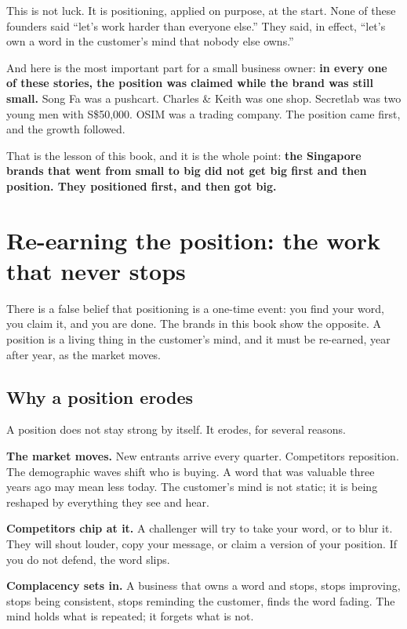 \documentclass[10pt,twoside,openany]{memoir}
\newcommand{\needspacehead}{\needspace{4\baselineskip}}
\let\oldsection\section
\renewcommand{\section}{\needspacehead\oldsection}
\begin{document}
This is not luck. It is positioning, applied on purpose, at the start.
None of these founders said ``let's work harder than everyone else.''
They said, in effect, ``let's own a word in the customer's mind that
nobody else owns.''

And here is the most important part for a small business owner:
\textbf{in every one of these stories, the position was claimed while
the brand was still small.} Song Fa was a pushcart. Charles \& Keith was
one shop. Secretlab was two young men with S\$50,000. OSIM was a trading
company. The position came first, and the growth followed.

That is the lesson of this book, and it is the whole point: \textbf{the
Singapore brands that went from small to big did not get big first and
then position. They positioned first, and then got big.}

\FloatBarrier
\chapter{Re-earning the position: the work that never
stops}\label{re-earning-the-position-the-work-that-never-stops}

There is a false belief that positioning is a one-time event: you find
your word, you claim it, and you are done. The brands in this book show
the opposite. A position is a living thing in the customer's mind, and
it must be re-earned, year after year, as the market moves.

\section{Why a position erodes}\label{why-a-position-erodes}

A position does not stay strong by itself. It erodes, for several
reasons.

\textbf{The market moves.} New entrants arrive every quarter.
Competitors reposition. The demographic waves shift who is buying. A
word that was valuable three years ago may mean less today. The
customer's mind is not static; it is being reshaped by everything they
see and hear.

\textbf{Competitors chip at it.} A challenger will try to take your
word, or to blur it. They will shout louder, copy your message, or claim
a version of your position. If you do not defend, the word slips.

\textbf{Complacency sets in.} A business that owns a word and stops,
stops improving, stops being consistent, stops reminding the customer,
finds the word fading. The mind holds what is repeated; it forgets what
is not.
\end{document}
